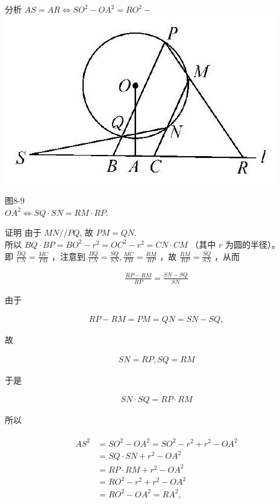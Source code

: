 \documentclass[10pt]{article}
\begin{document}
分析 $A S=A R \Leftrightarrow S O^{2}-O A^{2}=R O^{2}-$\\
\includegraphics[max width=\textwidth, center]{2024_10_30_66b8e5e701da2093c133g-061(1)}

图8-9\\
$O A^{2} \Leftrightarrow S Q \cdot S N=R M \cdot R P$.

证明 由于 $M N / / P Q$, 故 $P M=Q N$.\\
所以 $B Q \cdot B P=B O^{2}-r^{2}=O C^{2}-r^{2}=C N \cdot C M$ （其中 $r$ 为圆的半径）。\\
即 $\frac{B Q}{C N}=\frac{M C}{P B}$ ，注意到 $\frac{B Q}{C N}=\frac{S Q}{S N}, \frac{M C}{P B}=\frac{R M}{R P}$ ，故 $\frac{R M}{R P}=\frac{S Q}{S N}$ ，从而

\begin{align*}
\frac{R P-R M}{R P}=\frac{S N-S Q}{S N}
\end{align*}

由于

\begin{align*}
R P-R M=P M=Q N=S N-S Q,
\end{align*}

故

\begin{align*}
S N=R P, S Q=R M
\end{align*}

于是

\begin{align*}
S N \cdot S Q=R P \cdot R M
\end{align*}

所以

\begin{align*}
\begin{aligned}
A S^{2} & =S O^{2}-O A^{2}=S O^{2}-r^{2}+r^{2}-O A^{2} \\
& =S Q \cdot S N+r^{2}-O A^{2} \\
& =R P \cdot R M+r^{2}-O A^{2} \\
& =R O^{2}-r^{2}+r^{2}-O A^{2} \\
& =R O^{2}-O A^{2}=R A^{2},
\end{aligned}
\end{align*}
\end{document}
